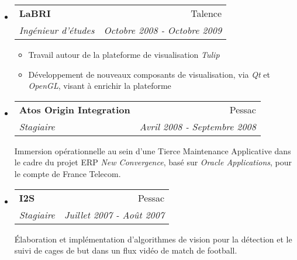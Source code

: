 \documentclass[letterpaper,11pt]{article}
\makeatletter
\newcommand{\resitem}[1]{\item #1 \vspace{-2pt}}
\newcommand{\ressubheading}[4]{
\begin{tabular*}{6.5in}{l@{\cftdotfill{\cftsecdotsep}\extracolsep{\fill}}r}
    \textbf{#1} & #2 \\
    \textit{#3} & \textit{#4} \\
\end{tabular*}\vspace{-6pt}}
\makeatother
\begin{document}
\begin{itemize}
  \item
    \ressubheading{LaBRI}{Talence}{Ingénieur d'études}{Octobre 2008 - Octobre 2009}
    \begin{itemize}
      \resitem{Travail autour de la plateforme de visualisation \emph{Tulip}}
      \resitem{Développement de nouveaux composants de visualisation, via \emph{Qt} et \emph{OpenGL}, visant à enrichir la plateforme}
    \end{itemize}

  \item
    \ressubheading{Atos Origin Integration}{Pessac}{Stagiaire}{Avril 2008 - Septembre 2008}

    Immersion opérationnelle au sein d'une Tierce Maintenance Applicative dans le cadre du projet ERP \emph{New Convergence}, basé sur \emph{Oracle Applications}, pour le compte de France Telecom.

  \item
    \ressubheading{I2S}{Pessac}{Stagiaire}{Juillet 2007 - Août 2007}

    Élaboration et implémentation d'algorithmes de vision pour la détection et le suivi de cages de but dans un flux vidéo de match de football.

\end{itemize}
\end{document}

